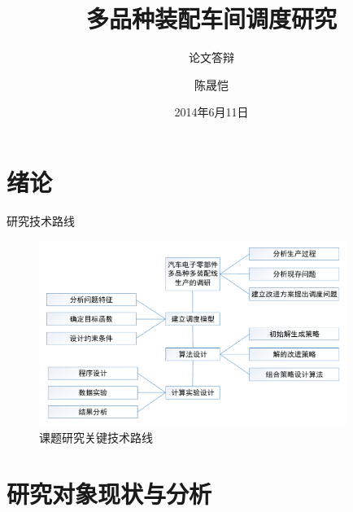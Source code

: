 \documentclass{beamer}
\title{多品种装配车间调度研究}
\subtitle{论文答辩}
\author{陈晟恺}
\institute[diufanshu@gmail.com]{健行理工1001~~201002750102\\ 指导老师：鲁建厦、董巧英 }
\date{2014年6月11日}
\begin{document}
\newtheorem{thm}{定理}
\begin{frame}
\titlepage
{}
\end{frame}
\section{绪论}

\begin{frame}{研究技术路线}
\begin{figure}
\centering
\includegraphics[width = 10cm]{techroute1.pdf}
\caption{课题研究关键技术路线}
\end{figure}
\end{frame}

\section{研究对象现状与分析}
\end{document}
